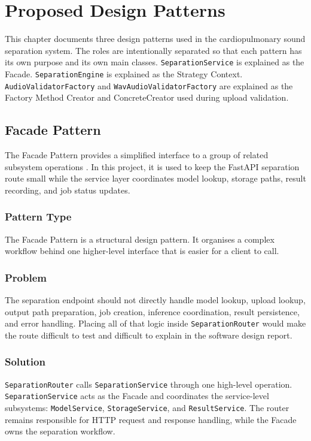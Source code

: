 \chapter{Proposed Design Patterns}
\sloppy

This chapter documents three design patterns used in the cardiopulmonary sound separation system. The roles are intentionally separated so that each pattern has its own purpose and its own main classes. \texttt{SeparationService} is explained as the Facade. \texttt{SeparationEngine} is explained as the Strategy Context. \texttt{AudioValidatorFactory} and \texttt{WavAudioValidatorFactory} are explained as the Factory Method Creator and ConcreteCreator used during upload validation.

\section{Facade Pattern}

The Facade Pattern provides a simplified interface to a group of related subsystem operations \parencite{gamma1994designpatterns}. In this project, it is used to keep the FastAPI separation route small while the service layer coordinates model lookup, storage paths, result recording, and job status updates.

\subsection{Pattern Type}

The Facade Pattern is a structural design pattern. It organises a complex workflow behind one higher-level interface that is easier for a client to call.

\subsection{Problem}

The separation endpoint should not directly handle model lookup, upload lookup, output path preparation, job creation, inference coordination, result persistence, and error handling. Placing all of that logic inside \texttt{SeparationRouter} would make the route difficult to test and difficult to explain in the software design report.

\subsection{Solution}

\texttt{SeparationRouter} calls \texttt{SeparationService} through one high-level operation. \texttt{SeparationService} acts as the Facade and coordinates the service-level subsystems: \texttt{ModelService}, \texttt{StorageService}, and \texttt{ResultService}. The router remains responsible for HTTP request and response handling, while the Facade owns the separation workflow.


